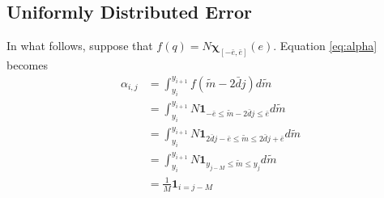 \documentclass[12pt]{article}
\begin{document}
\subsection{Uniformly Distributed Error}
In what follows, suppose that $f(q)=N\mathbf{\chi}_{[-\bar{e},\bar{e}]}(e)$. Equation \ref{eq:alpha} becomes
\begin{align}
	\alpha_{i,j}&=\int_{y_{i}}^{y_{i+1}}{f(\widetilde{m}-2\bar{d}j)d\widetilde{m}}\\
	&=\int_{y_{i}}^{y_{i+1}}{N\mathbf{1}_{-\bar{e}\leq\widetilde{m}-2\bar{d}j\leq\bar{e}}d\widetilde{m}}\\
	&=\int_{y_{i}}^{y_{i+1}}{N\mathbf{1}_{2\bar{d}j-\bar{e}\leq\widetilde{m}\leq 2\bar{d}j+\bar{e}}d\widetilde{m}}\\
	&=\int_{y_{i}}^{y_{i+1}}{N\mathbf{1}_{y_{j-M}\leq\widetilde{m}\leq y_{j}}d\widetilde{m}}\\
	&=\frac{1}{M}\mathbf{1}_{i=j-M}
\end{align}
\end{document}
